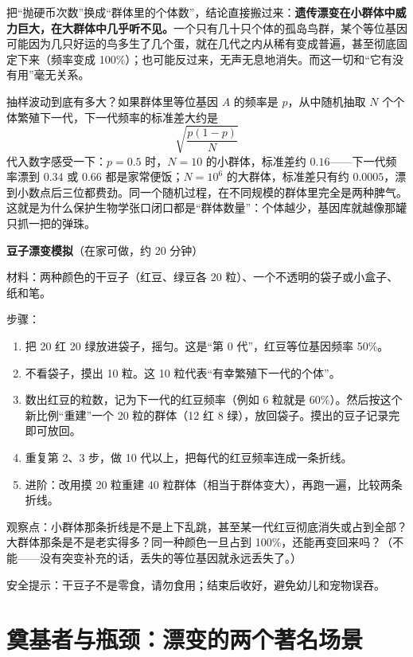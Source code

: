 把“抛硬币次数”换成“群体里的个体数”，结论直接搬过来：\textbf{遗传漂变在小群体中威力巨大，在大群体中几乎听不见。}一个只有几十只个体的孤岛鸟群，某个等位基因可能因为几只好运的鸟多生了几个蛋，就在几代之内从稀有变成普遍，甚至彻底固定下来（频率变成 100\%）；也可能反过来，无声无息地消失。而这一切和“它有没有用”毫无关系。

\begin{qiaoliang}
抽样波动到底有多大？如果群体里等位基因 $A$ 的频率是 $p$，从中随机抽取 $N$ 个个体繁殖下一代，下一代频率的标准差大约是
\[
\sqrt{\frac{p(1-p)}{N}}
\]
代入数字感受一下：$p=0.5$ 时，$N=10$ 的小群体，标准差约 $0.16$——下一代频率漂到 $0.34$ 或 $0.66$ 都是家常便饭；$N=10^{6}$ 的大群体，标准差只有约 $0.0005$，漂到小数点后三位都费劲。同一个随机过程，在不同规模的群体里完全是两种脾气。这就是为什么保护生物学张口闭口都是“群体数量”：个体越少，基因库就越像那罐只抓一把的弹珠。
\end{qiaoliang}

\begin{shiyan}
\textbf{豆子漂变模拟}（在家可做，约 20 分钟）

材料：两种颜色的干豆子（红豆、绿豆各 20 粒）、一个不透明的袋子或小盒子、纸和笔。

步骤：
\begin{enumerate}[itemsep=1pt]
\item 把 20 红 20 绿放进袋子，摇匀。这是“第 0 代”，红豆等位基因频率 50\%。
\item 不看袋子，摸出 10 粒。这 10 粒代表“有幸繁殖下一代的个体”。
\item 数出红豆的粒数，记为下一代的红豆频率（例如 6 粒就是 60\%）。然后按这个新比例“重建”一个 20 粒的群体（12 红 8 绿），放回袋子。摸出的豆子记录完即可放回。
\item 重复第 2、3 步，做 10 代以上，把每代的红豆频率连成一条折线。
\item 进阶：改用摸 20 粒重建 40 粒群体（相当于群体变大），再跑一遍，比较两条折线。
\end{enumerate}

观察点：小群体那条折线是不是上下乱跳，甚至某一代红豆彻底消失或占到全部？大群体那条是不是老实得多？同一种颜色一旦占到 100\%，还能再变回来吗？（不能——没有突变补充的话，丢失的等位基因就永远丢失了。）

安全提示：干豆子不是零食，请勿食用；结束后收好，避免幼儿和宠物误吞。
\end{shiyan}

\section{奠基者与瓶颈：漂变的两个著名场景}

